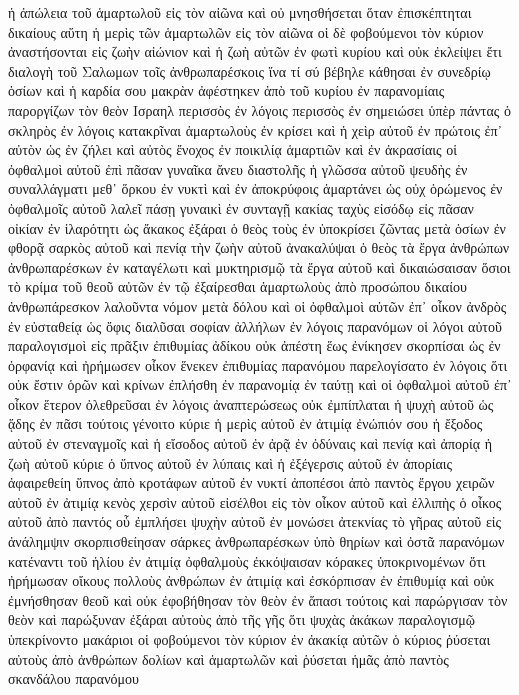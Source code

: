 ἡ ἀπώλεια τοῦ ἁμαρτωλοῦ εἰς τὸν αἰῶνα καὶ οὐ μνησθήσεται ὅταν ἐπισκέπτηται δικαίους
αὕτη ἡ μερὶς τῶν ἁμαρτωλῶν εἰς τὸν αἰῶνα οἱ δὲ φοβούμενοι τὸν κύριον ἀναστήσονται εἰς ζωὴν αἰώνιον καὶ ἡ ζωὴ αὐτῶν ἐν φωτὶ κυρίου καὶ οὐκ ἐκλείψει ἔτι
διαλογὴ τοῦ Σαλωμων τοῖς ἀνθρωπαρέσκοις
ἵνα τί σύ βέβηλε κάθησαι ἐν συνεδρίῳ ὁσίων καὶ ἡ καρδία σου μακρὰν ἀφέστηκεν ἀπὸ τοῦ κυρίου ἐν παρανομίαις παροργίζων τὸν θεὸν Ισραηλ
περισσὸς ἐν λόγοις περισσὸς ἐν σημειώσει ὑπὲρ πάντας ὁ σκληρὸς ἐν λόγοις κατακρῖναι ἁμαρτωλοὺς ἐν κρίσει
καὶ ἡ χεὶρ αὐτοῦ ἐν πρώτοις ἐπ᾽ αὐτὸν ὡς ἐν ζήλει καὶ αὐτὸς ἔνοχος ἐν ποικιλίᾳ ἁμαρτιῶν καὶ ἐν ἀκρασίαις
οἱ ὀφθαλμοὶ αὐτοῦ ἐπὶ πᾶσαν γυναῖκα ἄνευ διαστολῆς ἡ γλῶσσα αὐτοῦ ψευδὴς ἐν συναλλάγματι μεθ᾽ ὅρκου
ἐν νυκτὶ καὶ ἐν ἀποκρύφοις ἁμαρτάνει ὡς οὐχ ὁρώμενος ἐν ὀφθαλμοῖς αὐτοῦ λαλεῖ πάσῃ γυναικὶ ἐν συνταγῇ κακίας ταχὺς εἰσόδῳ εἰς πᾶσαν οἰκίαν ἐν ἱλαρότητι ὡς ἄκακος
ἐξάραι ὁ θεὸς τοὺς ἐν ὑποκρίσει ζῶντας μετὰ ὁσίων ἐν φθορᾷ σαρκὸς αὐτοῦ καὶ πενίᾳ τὴν ζωὴν αὐτοῦ
ἀνακαλύψαι ὁ θεὸς τὰ ἔργα ἀνθρώπων ἀνθρωπαρέσκων ἐν καταγέλωτι καὶ μυκτηρισμῷ τὰ ἔργα αὐτοῦ
καὶ δικαιώσαισαν ὅσιοι τὸ κρίμα τοῦ θεοῦ αὐτῶν ἐν τῷ ἐξαίρεσθαι ἁμαρτωλοὺς ἀπὸ προσώπου δικαίου ἀνθρωπάρεσκον λαλοῦντα νόμον μετὰ δόλου
καὶ οἱ ὀφθαλμοὶ αὐτῶν ἐπ᾽ οἶκον ἀνδρὸς ἐν εὐσταθείᾳ ὡς ὄφις διαλῦσαι σοφίαν ἀλλήλων ἐν λόγοις παρανόμων
οἱ λόγοι αὐτοῦ παραλογισμοὶ εἰς πρᾶξιν ἐπιθυμίας ἀδίκου οὐκ ἀπέστη ἕως ἐνίκησεν σκορπίσαι ὡς ἐν ὀρφανίᾳ
καὶ ἠρήμωσεν οἶκον ἕνεκεν ἐπιθυμίας παρανόμου παρελογίσατο ἐν λόγοις ὅτι οὐκ ἔστιν ὁρῶν καὶ κρίνων
ἐπλήσθη ἐν παρανομίᾳ ἐν ταύτῃ καὶ οἱ ὀφθαλμοὶ αὐτοῦ ἐπ᾽ οἶκον ἕτερον ὀλεθρεῦσαι ἐν λόγοις ἀναπτερώσεως
οὐκ ἐμπίπλαται ἡ ψυχὴ αὐτοῦ ὡς ᾅδης ἐν πᾶσι τούτοις
γένοιτο κύριε ἡ μερὶς αὐτοῦ ἐν ἀτιμίᾳ ἐνώπιόν σου ἡ ἔξοδος αὐτοῦ ἐν στεναγμοῖς καὶ ἡ εἴσοδος αὐτοῦ ἐν ἀρᾷ
ἐν ὀδύναις καὶ πενίᾳ καὶ ἀπορίᾳ ἡ ζωὴ αὐτοῦ κύριε ὁ ὕπνος αὐτοῦ ἐν λύπαις καὶ ἡ ἐξέγερσις αὐτοῦ ἐν ἀπορίαις
ἀφαιρεθείη ὕπνος ἀπὸ κροτάφων αὐτοῦ ἐν νυκτί ἀποπέσοι ἀπὸ παντὸς ἔργου χειρῶν αὐτοῦ ἐν ἀτιμίᾳ
κενὸς χερσὶν αὐτοῦ εἰσέλθοι εἰς τὸν οἶκον αὐτοῦ καὶ ἐλλιπὴς ὁ οἶκος αὐτοῦ ἀπὸ παντός οὗ ἐμπλήσει ψυχὴν αὐτοῦ
ἐν μονώσει ἀτεκνίας τὸ γῆρας αὐτοῦ εἰς ἀνάλημψιν
σκορπισθείησαν σάρκες ἀνθρωπαρέσκων ὑπὸ θηρίων καὶ ὀστᾶ παρανόμων κατέναντι τοῦ ἡλίου ἐν ἀτιμίᾳ
ὀφθαλμοὺς ἐκκόψαισαν κόρακες ὑποκρινομένων ὅτι ἠρήμωσαν οἴκους πολλοὺς ἀνθρώπων ἐν ἀτιμίᾳ καὶ ἐσκόρπισαν ἐν ἐπιθυμίᾳ
καὶ οὐκ ἐμνήσθησαν θεοῦ καὶ οὐκ ἐφοβήθησαν τὸν θεὸν ἐν ἅπασι τούτοις καὶ παρώργισαν τὸν θεὸν καὶ παρώξυναν
ἐξάραι αὐτοὺς ἀπὸ τῆς γῆς ὅτι ψυχὰς ἀκάκων παραλογισμῷ ὑπεκρίνοντο
μακάριοι οἱ φοβούμενοι τὸν κύριον ἐν ἀκακίᾳ αὐτῶν ὁ κύριος ῥύσεται αὐτοὺς ἀπὸ ἀνθρώπων δολίων καὶ ἁμαρτωλῶν καὶ ῥύσεται ἡμᾶς ἀπὸ παντὸς σκανδάλου παρανόμου

